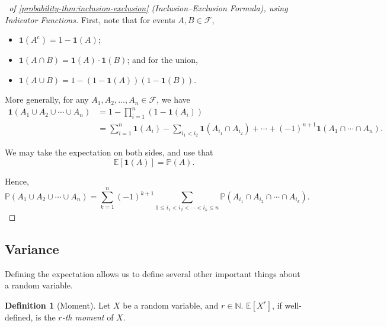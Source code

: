 \documentclass[11pt]{article}
\numberwithin{equation}{section}
\theoremstyle{definition}
\newtheorem{definition}[theorem]{Definition}
\theoremstyle{remark}
\newcommand{\pqty}[1]{\left(#1\right)}
\newcommand{\bqty}[1]{\left[#1\right]}
\newcommand{\NN}{\mathbb N}
\newcommand{\indicator}{\mathbf 1}
\newcommand{\compl}{^{\mathrm c}}
\newcommand{\eventSpace}{\mathcal F}
\newcommand{\Prob}{\mathbb P}
\newcommand{\Expt}{\mathbb E}
\begin{document}
\begin{proof}[\proofname\ of \autoref{probability-thm:inclusion-exclusion} (Inclusion--Exclusion Formula), using Indicator Functions]\label{probability-proof-020}
    First, note that for events \(A, B \in \eventSpace\),
    \begin{itemize}
        \item \(\indicator\pqty{A\compl} = 1 - \indicator\pqty{A}\);
        \item \(\indicator\pqty{A \cap B} = \indicator\pqty{A} \cdot \indicator\pqty{B}\); and for the union,
        \item \(\indicator\pqty{A \cup B} = 1 - \pqty{1 - \indicator\pqty{A}} \pqty{1 - \indicator\pqty{B}}\).
    \end{itemize}

    More generally, for any \(A_1, A_2, \ldots, A_n \in \eventSpace\), we have
    \begin{align*}
        \indicator\pqty{A_1 \cup A_2 \cup \cdots \cup A_n} &= 1 - \prod_{i = 1}^{n} \pqty{1 - \indicator\pqty{A_i}} \\
        &= \sum_{i = 1}^{n} \indicator \pqty{A_i} - \sum_{i_1 < i_2} \indicator\pqty{A_{i_1} \cap A_{i_2}} + \cdots + \pqty{-1}^{n + 1} \indicator\pqty{A_1 \cap \cdots \cap A_n}.
    \end{align*}

    We may take the expectation on both sides, and use that
    \[
        \Expt\bqty{\indicator\pqty{A}} = \Prob\pqty{A}.
    \]

    Hence,
    \[
        \Prob\pqty{A_1 \cup A_2 \cup \cdots \cup A_n} = \sum_{k = 1}^{n}(-1)^{k+1} \sum_{1 \leq i_1 < i_2 < \cdots < i_k \leq n} \Prob\pqty{A_{i_1} \cap A_{i_2} \cap \cdots \cap A_{i_k}}.
    \]
\end{proof}

\subsection{Variance}

Defining the expectation allows us to define several other important things about a random variable.

\begin{definition}[Moment]\label{probability-definition-026}
    \label{probability-def:moment}%
    Let \(X\) be a random variable, and \(r \in \NN\). \(\Expt\bqty{X^r}\), if well-defined, is the \emph{\(r\)-th moment} of \(X\).
\end{definition}
\end{document}
